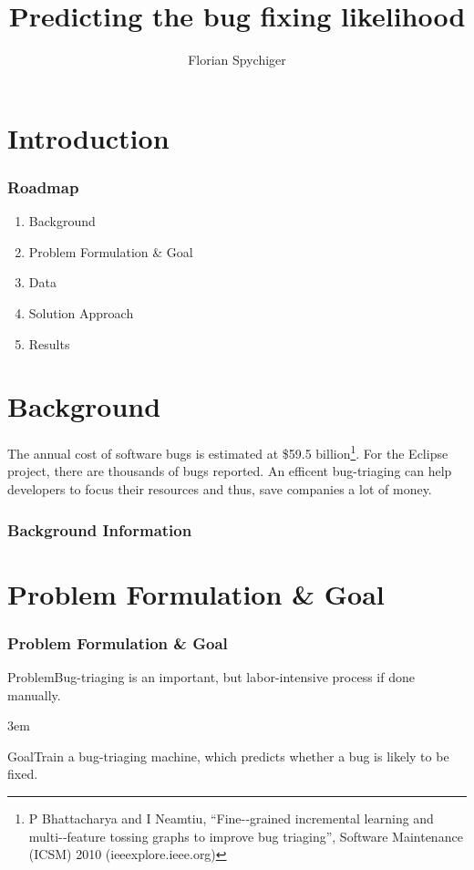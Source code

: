 \documentclass[xcolor=sgvnames,serifs,notes,compress,professionalfont]{beamer}
\begin{document}
	
\title{Predicting the bug fixing likelihood}
\author{Florian Spychiger}

\begin{frame}
	\titlepage
\end{frame}

\section{Introduction}
\begin{frame}
\frametitle{Roadmap}
	\begin{enumerate}
		\item Background
		\item Problem Formulation \& Goal
		\item Data
		\item Solution Approach
		\item Results
	\end{enumerate}
\end{frame}

\section{Background}
\begin{frame}
The annual cost of software bugs is estimated at \$59.5 billion\footnote{P Bhattacharya and I Neamtiu, “Fine-­‐grained incremental learning and multi-­‐feature tossing graphs to improve bug triaging”, Software Maintenance (ICSM) 2010 (ieeexplore.ieee.org)}. For the Eclipse project, there are thousands of bugs reported. An efficent bug-triaging can help developers to focus their resources and thus, save companies a lot of money. 
\frametitle{Background Information}
\end{frame}

\section{Problem Formulation \& Goal}
\begin{frame}
\frametitle{Problem Formulation \& Goal}
\begin{alertblock}{Problem}Bug-triaging is an important, but labor-intensive process if done manually.\end{alertblock}
\kern 3em
\begin{block}{Goal}Train a bug-triaging machine, which predicts whether a bug is likely to be fixed.\end{block}
\end{frame}
\end{document}
